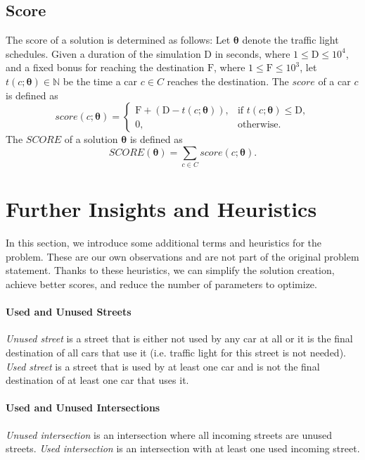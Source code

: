\newpage

\subsection{Score}

The score of a solution is determined as follows: Let $\bm{\theta}$ denote the traffic light schedules. Given a duration of the simulation $\mathrm{D}$ in seconds, where $1 \leq \mathrm{D} \leq 10^4$, and a fixed bonus for reaching the destination $\mathrm{F}$, where $1 \leq \mathrm{F} \leq 10^3$, let $t(c; \bm{\theta}) \in \mathbb{N}$ be the time a car $c \in C$ reaches the destination. The $score$ of a car $c$ is defined as
\begin{equation}
    score(c; \bm{\theta}) =
    \begin{cases}
        \mathrm{F} + (\mathrm{D} - t(c; \bm{\theta})), & \text{if $t(c; \bm{\theta}) \leq \mathrm{D}$}, \\
        0, & \text{otherwise}.
    \end{cases}
\end{equation}
The $SCORE$ of a solution $\bm{\theta}$ is defined as
\begin{equation}
    SCORE(\bm{\theta}) = \sum_{c \in C} score(c; \bm{\theta}).
\end{equation}

\section{Further Insights and Heuristics} \label{sec:further_insights_and_heuristics}

In this section, we introduce some additional terms and heuristics for the problem. These are our own observations and are not part of the original problem statement. Thanks to these heuristics, we can simplify the solution creation, achieve better scores, and reduce the number of parameters to optimize.

\paragraph{Used and Unused Streets} \textit{Unused street} is a street that is either not used by any car at all or it is the final destination of all cars that use it (i.e. traffic light for this street is not needed). \textit{Used street} is a street that is used by at least one car and is not the final destination of at least one car that uses it.

\paragraph{Used and Unused Intersections} \textit{Unused intersection} is an intersection where all incoming streets are unused streets. \textit{Used intersection} is an intersection with at least one used incoming street.

